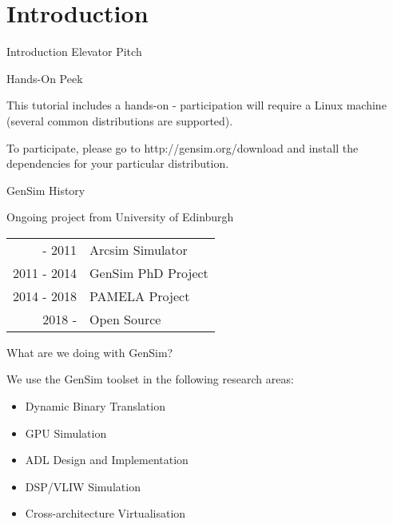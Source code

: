 
\section{Introduction}

\begin{frame}{Introduction}
\centering
Elevator Pitch
\end{frame}

\begin{frame}{Hands-On Peek}

This tutorial includes a hands-on - participation will require a Linux
machine (several common distributions are supported).

\bigskip

To participate, please go to http://gensim.org/download and install
the dependencies for your particular distribution.

\end{frame}

\begin{frame}{GenSim History}


\centering
Ongoing project from University of Edinburgh

\smallskip

\begin{tabular}{r l}
\phantom{0000} - 2011 & Arcsim Simulator \\
2011 - 2014 & GenSim PhD Project \\
2014 - 2018 & PAMELA Project \\
2018 - \phantom{0000}        & Open Source
\end{tabular}

\end{frame}

\begin{frame}{What are we doing with GenSim?}

We use the GenSim toolset in the following research areas:

\begin{itemize}
\item Dynamic Binary Translation
\item GPU Simulation
\item ADL Design and Implementation
\item DSP/VLIW Simulation
\item Cross-architecture Virtualisation
\end{itemize}

\end{frame}

